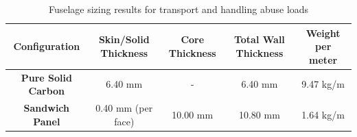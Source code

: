 \begin{table}[H]
    \centering
    \caption{Fuselage sizing results for transport and handling abuse loads}
    \begin{tabular}{|c||c|c|c|c|}\hline
         \textbf{Configuration} & Skin/Solid Thickness & Core Thickness & Total Wall Thickness & Weight per meter \\\hline
         \textbf{Pure Solid Carbon} & 6.40 mm & - & 6.40 mm & 9.47 kg/m \\\hline
         \textbf{Sandwich Panel} & 0.40 mm (per face) & 10.00 mm & 10.80 mm & 1.64 kg/m \\\hline
    \end{tabular}
    
    \label{tab:exec-fuselage_handling_loads}
\end{table}



